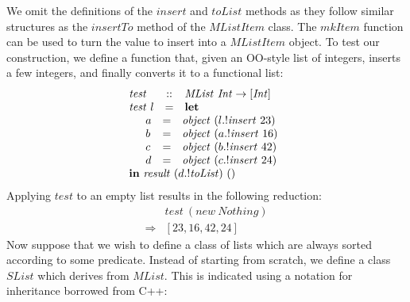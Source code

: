 \documentclass[authoryear,preprint]{sigplanconf}
\begin{document}
We omit the definitions of the $\mathit{insert}$ and $\mathit{toList}$ methods as they follow similar structures as the $\mathit{insertTo}$ method of the $\mathit{MListItem}$ class. The $\mathit{mkItem}$ function can be used to turn the value to insert into a $\mathit{MListItem}$ object. To test our construction, we define a function that, given an OO-style list of integers, inserts a few integers, and finally converts it to a functional list:
\begin{displaymath}
\begin{array}{lcl}
\mathit{test} & :: & \mathit{MList}~\mathit{Int} \to [\mathit{Int}]\\
\mathit{test}~l & = & \mathbf{let} \\
\multicolumn{3}{l}{\quad \begin{array}{lcl}
    a & = & \mathit{object}~(l.!\mathit{insert}~23)\\
    b & = & \mathit{object}~(a.!\mathit{insert}~16)\\
    c & = & \mathit{object}~(b.!\mathit{insert}~42)\\
    d & = & \mathit{object}~(c.!\mathit{insert}~24)\\
    \end{array}}\\
\multicolumn{3}{l}{\mathbf{in}~\mathit{result}~(d.!\mathit{toList})~()}
\end{array}
\end{displaymath}
Applying $\mathit{test}$ to an empty list results in the following reduction:
\begin{displaymath}
\begin{array}{cl}
& \mathit{test}~(\mathit{new}~\mathit{Nothing}) \\
\Rightarrow & [23,16,42,24]
\end{array}
\end{displaymath}
Now suppose that we wish to define a class of lists which are always sorted according to some predicate. Instead of starting from scratch, we define a class $\mathit{SList}$ which derives from $\mathit{MList}$. This is indicated using a notation for inheritance borrowed from C++:
\end{document}
